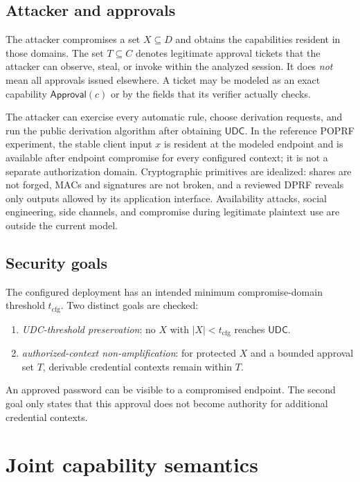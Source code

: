 \documentclass[preprint,12pt]{elsarticle}
\newcommand{\UDC}{\mathsf{UDC}}
\begin{document}
\subsection{Attacker and approvals}

The attacker compromises a set $X\subseteq D$ and obtains the capabilities
resident in those domains.  The set $T\subseteq C$ denotes legitimate approval
tickets that the attacker can observe, steal, or invoke within the analyzed
session.  It does \emph{not} mean all approvals issued elsewhere.  A ticket may
be modeled as an exact capability $\mathsf{Approval}(c)$ or by the fields that
its verifier actually checks.

The attacker can exercise every automatic rule, choose derivation requests,
and run the public derivation algorithm after obtaining $\UDC$.
In the reference POPRF experiment, the stable client input $x$ is resident at
the modeled endpoint and is available after endpoint compromise for every
configured context; it is not a separate authorization domain.
Cryptographic primitives are idealized: shares are not forged,
MACs and signatures are not broken, and a reviewed DPRF reveals only outputs
allowed by its application interface.  Availability attacks, social
engineering, side channels, and compromise during legitimate plaintext use are
outside the current model.

\subsection{Security goals}

The configured deployment has an intended minimum compromise-domain threshold
$t_{\mathrm{cfg}}$.  Two distinct goals are checked:

\begin{enumerate}[leftmargin=*]
\item \emph{UDC-threshold preservation}: no $X$ with
  $|X|<t_{\mathrm{cfg}}$ reaches $\UDC$.
\item \emph{authorized-context non-amplification}: for protected $X$ and a
  bounded approval set $T$, derivable credential contexts remain within $T$.
\end{enumerate}

An approved password can be visible to a compromised endpoint.  The second
goal only states that this approval does not become authority for additional
credential contexts.

\section{Joint capability semantics}
\end{document}

